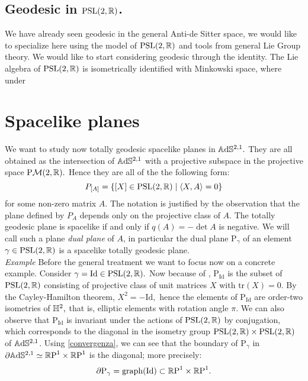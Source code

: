 \subsection{Geodesic in $\text{PSL}(2,\mathbb{R})$.} We have already seen geodesic in the general Anti-de Sitter space, we would like to specialize here using the model of $\text{PSL}(2,\mathbb{R})$ and tools from general Lie Group theory.  We would like to start considering geodesic through the identity. The Lie algebra of $\text{PSL}(2,\mathbb{R})$ is isometrically identified with Minkowski space, where under

\section{Spacelike planes}
We want to study now totally geodesic spacelike planes in $\mathbb{A}\mathrm{d}\mathbb{S}^{2,1}.$ They are all obtained as the intersection of $\mathbb{A}\mathrm{d}\mathbb{S}^{2,1}$ with a projective subspace in the projective space $\text{P}\mathcal{M}(2,\mathbb{R}).$ Hence they are all of the the following form: 
\begin{equation}\label{geoplanes}
    P_{[A]}=\{[X]\in\text{PSL}(2,\mathbb{R})\;|\;\langle X,A\rangle=0\}
\end{equation}
for some non-zero matrix $A$. The notation is justified by the observation that the plane defined by $P_A$ depends only on the projective class of $A$. The totally geodesic plane is spacelike if and only if $q(A)=-\det A$ is negative. We will call such a plane \textit{dual plane} of $A$, in particular the dual plane $\text{P}_\gamma$  of an element $\gamma\in\text{PSL}(2,\mathbb{R})$ is a spacelike totally geodesic plane. \\
\textit{Example}
Before the general treatment we want to focus now on a concrete example. Consider $\gamma=\text{Id}\in\text{PSL}(2,\mathbb{R}).$ Now because of , $\text{P}_{\text{Id}}$ is the subset of $\text{PSL}(2,\mathbb{R})$ consisting of projective class of unit matrices $X$ with $\text{tr}(X)=0$. By the Cayley-Hamilton theorem, $X^2=-\text{Id},$ hence the elements of $\text{P}_{\text{Id}}$ are order-two isometries of $\mathbb{H}^2,$ that is, elliptic elements with rotation angle $\pi$.  We can also observe that $\text{P}_{\text{Id}}$ is invariant under the actions of $\text{PSL}(2,\mathbb{R})$ by conjugation, which corresponds to the diagonal in the isometry group $\text{PSL}(2,\mathbb{R})\times\text{PSL}(2,\mathbb{R})$ of $\mathbb{A}\mathrm{d}\mathbb{S}^{2,1}$. Using \ref{convergenza}, we can see that the boundary of $\text{P}_\gamma$ in $\partial\mathbb{A}\mathrm{d}\mathbb{S}^{2,1}\simeq \mathbb{R}\text{P}^1\times\mathbb{R}\text{P}^1$ is the diagonal; more precisely: 
\begin{equation}\label{graphino}
    \partial\text{P}_\gamma=\text{graph(Id)}\subset \mathbb{R}\text{P}^1\times\mathbb{R}\text{P}^1.
\end{equation}

